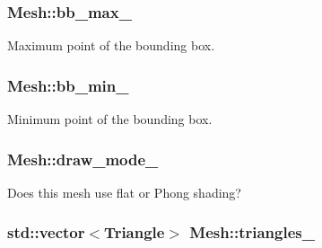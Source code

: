\subsubsection[{\texorpdfstring{bb\+\_\+max\+\_\+}{bb_max_}}]{ Mesh\+::bb\+\_\+max\+\_\+\hspace{0.3cm}{\ttfamily [private]}}\hypertarget{classMesh_acb17b74d4630a25eb2586a5d2c89975d}{}\label{classMesh_acb17b74d4630a25eb2586a5d2c89975d}


Maximum point of the bounding box. 

\subsubsection[{\texorpdfstring{bb\+\_\+min\+\_\+}{bb_min_}}]{ Mesh\+::bb\+\_\+min\+\_\+\hspace{0.3cm}{\ttfamily [private]}}\hypertarget{classMesh_a92a3f0d35d2508cae425862f4d302943}{}\label{classMesh_a92a3f0d35d2508cae425862f4d302943}


Minimum point of the bounding box. 

\subsubsection[{\texorpdfstring{draw\+\_\+mode\+\_\+}{draw_mode_}}]{ Mesh\+::draw\+\_\+mode\+\_\+\hspace{0.3cm}{\ttfamily [private]}}\hypertarget{classMesh_a00bc30acf9fbbf37a6626aefeeae40ab}{}\label{classMesh_a00bc30acf9fbbf37a6626aefeeae40ab}


Does this mesh use flat or Phong shading? 

\subsubsection[{\texorpdfstring{triangles\+\_\+}{triangles_}}]{\setlength{\rightskip}{0pt plus 5cm}std\+::vector$<${\bf Triangle}$>$ Mesh\+::triangles\+\_\+\hspace{0.3cm}{\ttfamily [private]}}\hypertarget{classMesh_a13455b3ace274f1d3d36ee45c7a3988d}{}\label{classMesh_a13455b3ace274f1d3d36ee45c7a3988d}


